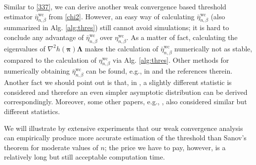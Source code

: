 \documentclass[10pt, twocolumn]{IEEEtran}
\begin{document}
 {Similar to \eqref{337}, we
can derive another weak convergence based threshold estimator
$\bar{\eta}_{n,\beta}^{\text{wc}}$ from \eqref{chi2}. However, an easy
way of calculating $\bar{\eta}_{n,\beta}^{\text{wc}}$ (also summarized
in Alg. \ref{alg:thres}) still cannot avoid simulations; it is hard to
conclude any advantage of $\bar{\eta}_{n,\beta}^{\text{wc}}$ over
${\eta}_{n,\beta}^{\text{wc}}$. As a matter of fact, calculating the
eigenvalues of ${\nabla ^2}h( {\boldsymbol{\pi}} )\boldsymbol{\Lambda}$
makes the calculation of $\bar{\eta}_{n,\beta}^{\text{wc}}$ numerically
not as stable, compared to the calculation of
${\eta}_{n,\beta}^{\text{wc}}$ via Alg. \ref{alg:thres}. Other methods
for numerically obtaining $\bar{\eta}_{n,\beta}^{\text{wc}}$ can be
found, e.g., in \cite{liu2009new} and the references therein. Another
fact we should point out is that, in
\cite[p. 30]{billingsley1961statistical}, a slightly different statistic
is considered and therefore an even simpler asymptotic distribution can
be derived correspondingly. Moreover, some other papers, e.g.,
\cite{menendez1997testing,menendez1999inference}, also considered
similar but different statistics.}

We will illustrate by extensive experiments that our weak convergence
analysis can empirically produce more accurate estimation of the
threshold than Sanov's theorem {for moderate values of $n$}; the
price we have to pay, however, is a relatively long but still acceptable
computation time.
\end{document}
